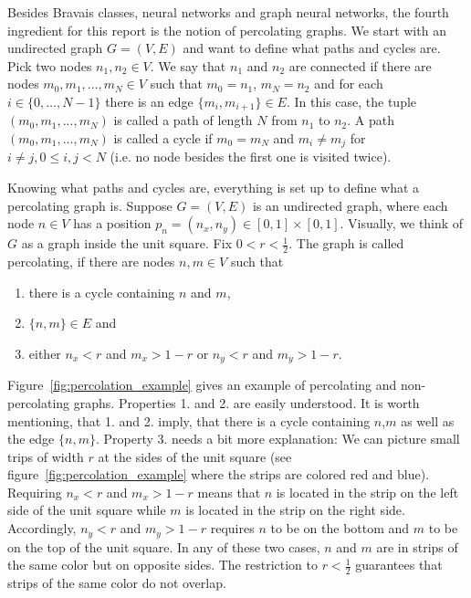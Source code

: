 Besides Bravais classes, neural networks and graph neural networks, the fourth ingredient for this report is the notion of percolating graphs.
We start with an undirected graph $G=(V,E)$ and want to define what paths and cycles are. Pick two nodes $n_1, n_2\in V$. We say that $n_1$ and $n_2$ are connected if
there are nodes $m_0,m_1,\dots,m_N\in V$ such that $m_0=n_1$, $m_N=n_2$ and for each $i\in\{0,\dots,N-1\}$ there is an edge $\{m_i,m_{i+1}\}\in E$.
In this case, the tuple $(m_0,m_1,...,m_N)$ is called a path of length $N$ from $n_1$ to $n_2$. 
A path $(m_0,m_1,...,m_N)$ is called a cycle if $m_0=m_N$ and $m_i\neq m_j$ for $i\neq j, 0\leq i,j<N$ 
(i.e. no node besides the first one is visited twice).

Knowing what paths and cycles are, everything is set up to define what a percolating graph is. 
Suppose $G=(V,E)$ is an undirected graph, where each node $n\in V$ has a position 
$p_n=(n_x,n_y)\in[0,1]\times[0,1]$. Visually, we think of $G$ as a graph inside the unit square.
Fix $0<r<\frac{1}{2}$. The graph is called percolating, if there are nodes $n,m\in V$ such that
\begin{enumerate}
    \item there is a cycle containing $n$ and $m$,
    \item $\{n,m\}\in E$ and
    \item either $n_x<r$ and $m_x>1-r$ or $n_y<r$ and $m_y>1-r$.
\end{enumerate}
Figure~\ref{fig:percolation_example} gives an example of percolating and non-percolating graphs. 
Properties 1. and 2. are easily understood. It is worth mentioning, that 1. and 2. imply, that there is a cycle containing $n$,$m$ as well as the edge $\{n,m\}$.
Property 3. needs a bit more explanation: We can picture small trips of width $r$ at the sides of the unit square 
(see figure~\ref{fig:percolation_example} where the strips are colored red and blue). 
Requiring $n_x<r$ and $m_x>1-r$ means that $n$ is located in the strip on the left side of the unit square while
$m$ is located in the strip on the right side. 
Accordingly, $n_y<r$ and $m_y>1-r$ requires $n$ to be on the bottom and $m$ to be on the top of the unit square.
In any of these two cases, $n$ and $m$ are in strips of the same color but on opposite sides.
The restriction to $r<\frac{1}{2}$ guarantees that strips of the same color do not overlap.

